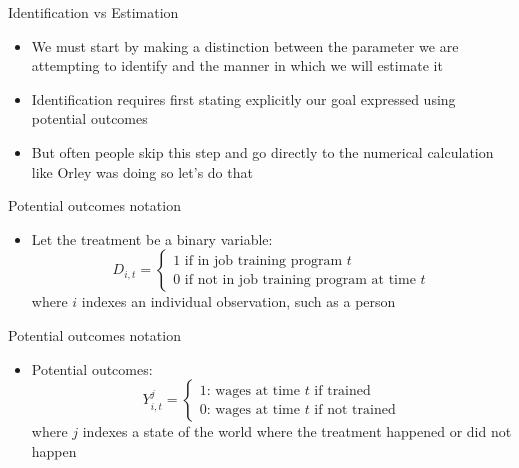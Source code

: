 \documentclass{beamer}
\begin{document}
\begin{frame}{Identification vs Estimation}

\begin{itemize}
\item We must start by making a distinction between the parameter we are attempting to identify and the manner in which we will estimate it
\item Identification requires first stating explicitly our goal expressed using potential outcomes
\item But often people skip this step and go directly to the numerical calculation like Orley was doing so let's do that

\end{itemize}

\end{frame}






\begin{frame}{Potential outcomes notation}
	
	\begin{itemize}
	\item Let the treatment be a binary variable: $$D_{i,t} =\begin{cases} 1 \text{ if in job training program $t$} \\ 0 \text{ if not in job training program at time $t$} \end{cases}$$where $i$ indexes an individual observation, such as a person

	\end{itemize}
\end{frame}

\begin{frame}{Potential outcomes notation}
	
	\begin{itemize}

	\item Potential outcomes: $$Y_{i,t}^j =\begin{cases} 1 \text{: wages at time $t$ if trained} \\ 0 \text{: wages at time $t$ if not trained} \end{cases}$$where $j$ indexes a state of the world where the treatment happened or did not happen

	\end{itemize}
\end{frame}
\end{document}
